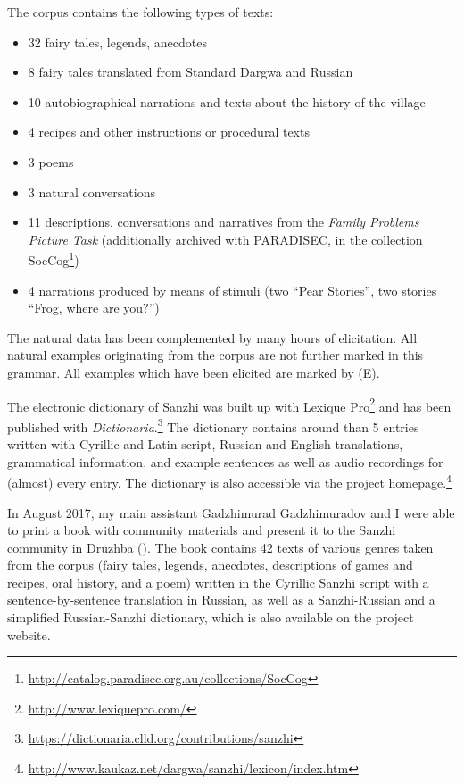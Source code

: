 The corpus contains the following types of texts:

\begin{itemize}
	\item 32 fairy tales, legends, anecdotes
	\item 8 fairy tales translated from Standard Dargwa and Russian
	\item 10 autobiographical narrations and texts about the history of the village
	\item 4 recipes and other instructions or procedural texts
	\item 3 poems
	\item 3 natural conversations
	\item 11 descriptions, conversations and narratives from the \textit{\textit{Family Problems Picture Task}} \citep{SanRoqueEtAl2012} (additionally archived with PARADISEC, in the collection SocCog\footnote{\url{http://catalog.paradisec.org.au/collections/SocCog}})
	\item 4 narrations produced by means of stimuli (two ``Pear Stories'', two stories ``Frog, where are you?'') 
\end{itemize}

The natural data has been complemented by many hours of elicitation. All natural examples originating from the corpus are not further marked in this grammar. All examples which have been elicited are marked by (E).




\sloppy The electronic dictionary of Sanzhi was built up with Lexique Pro\footnote{\url{http://www.lexiquepro.com/}} and has been published with \textit{Dictionaria}.\footnote{\url{https://dictionaria.clld.org/contributions/sanzhi}} The dictionary contains around than 5 entries written with Cyrillic and Latin script, Russian and English translations, grammatical information, and example sentences as well as audio recordings for (almost) every entry. The dictionary is also accessible via the project homepage.\footnote{\url{http://www.kaukaz.net/dargwa/sanzhi/lexicon/index.htm}}

In August 2017, my main assistant Gadzhimurad Gadzhimuradov and I were able to print a book with community materials and present it to the Sanzhi community in Druzhba (). The book contains 42 texts of various genres taken from the corpus (fairy tales, legends, anecdotes, descriptions of games and recipes, oral history, and a poem) written in the Cyrillic Sanzhi script with a sentence-by-sentence translation in Russian, as well as a Sanzhi-Russian and a simplified Russian-Sanzhi dictionary, which is also available on the project website.

